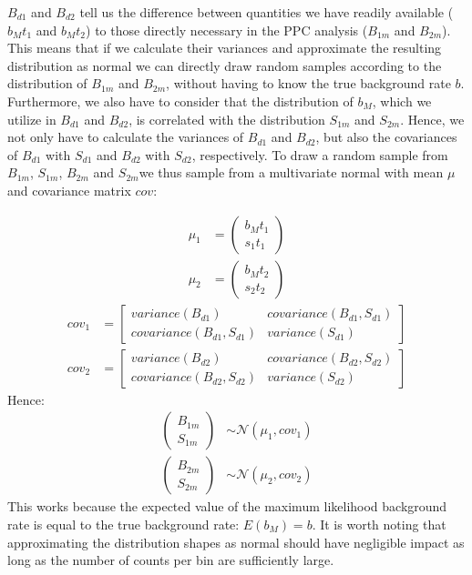 \documentclass{report}
\begin{document}
$B_{d1}$ and $B_{d2}$ tell us the difference between quantities we have readily available ($b_Mt_1$ and $b_Mt_2$) to those directly necessary in the PPC analysis ($B_{1m}$ and $B_{2m}$). This means that if we calculate their variances and approximate the resulting distribution as normal we can directly draw random samples according to the distribution of $B_{1m}$ and $B_{2m}$, without having to know the true background rate $b$. Furthermore, we also have to consider that the distribution of $b_M$, which we utilize in $B_{d1}$ and $B_{d2}$, is correlated with the distribution $S_{1m}$ and $S_{2m}$. Hence, we not only have to calculate the variances of $B_{d1}$ and $B_{d2}$, but also the covariances of $B_{d1}$ with $S_{d1}$ and $B_{d2}$ with $S_{d2}$, respectively. To draw a random sample from $B_{1m}$, $S_{1m}$, $B_{2m}$ and $S_{2m}$we thus sample from a multivariate normal with mean $\mu$ and covariance matrix $cov$:

\begin{align}
    \mu_1 &= \begin{pmatrix}
        b_Mt_1 \\ s_1t_1
    \end{pmatrix} \\
    \mu_2 &= \begin{pmatrix}
      b_Mt_2 \\ s_2t_2
  \end{pmatrix} 
\end{align}
\begin{align}
    cov_1 &= \begin{bmatrix}
        variance(B_{d1}) & covariance(B_{d1}, S_{d1})\\ covariance(B_{d1}, S_{d1}) & variance(S_{d1})
    \end{bmatrix} \\
    cov_2 &= \begin{bmatrix}
      variance(B_{d2}) & covariance(B_{d2}, S_{d2})\\ covariance(B_{d2}, S_{d2}) & variance(S_{d2})
  \end{bmatrix}
\end{align}
Hence: 
\begin{align}
    \begin{pmatrix}
        B_{1m} \\ S_{1m}
    \end{pmatrix}
    &\sim \mathcal{N}(\mu_1, cov_1)\\
    \begin{pmatrix}
      B_{2m} \\ S_{2m}
  \end{pmatrix}
  &\sim \mathcal{N}(\mu_2, cov_2)
\end{align}
This works because the expected value of the maximum likelihood background rate is equal to the true background rate: $E(b_M) = b$. It is worth noting that approximating the distribution shapes as normal should have negligible impact as long as the number of counts per bin are sufficiently large.
\end{document}
